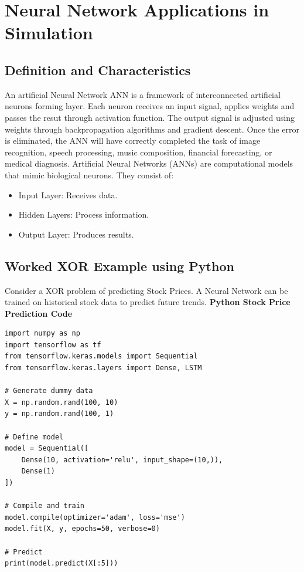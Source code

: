 \documentclass[12pt,a4paper]{article}
\begin{document}
\section{Neural Network Applications in Simulation}
\subsection{Definition and Characteristics}
An artificial Neural Network ANN is a framework of interconnected artificial neurons forming layer. Each neuron receives an input signal, applies weights and passes the resut through activation function. The output signal is adjusted using weights through backpropagation algorithms and gradient descent. Once the error is eliminated, the ANN will have correctly completed the task of image recognition, speech processing, music composition, financial forecasting, or medical diagnosis.
Artificial Neural Networks (ANNs) are computational models that mimic biological neurons. They consist of:
\begin{itemize}
    \item Input Layer: Receives data.
    \item Hidden Layers: Process information.
    \item Output Layer: Produces results.
\end{itemize}

\begin{example}
\subsection{Worked XOR Example using Python}
Consider a XOR problem of predicting Stock Prices. A Neural Network can be trained on historical stock data to predict future trends.
\textbf{Python Stock Price Prediction Code}
\begin{verbatim}
import numpy as np
import tensorflow as tf
from tensorflow.keras.models import Sequential
from tensorflow.keras.layers import Dense, LSTM

# Generate dummy data
X = np.random.rand(100, 10)
y = np.random.rand(100, 1)

# Define model
model = Sequential([
    Dense(10, activation='relu', input_shape=(10,)),
    Dense(1)
])

# Compile and train
model.compile(optimizer='adam', loss='mse')
model.fit(X, y, epochs=50, verbose=0)

# Predict
print(model.predict(X[:5]))
\end{verbatim}
\end{example}
\end{document}
